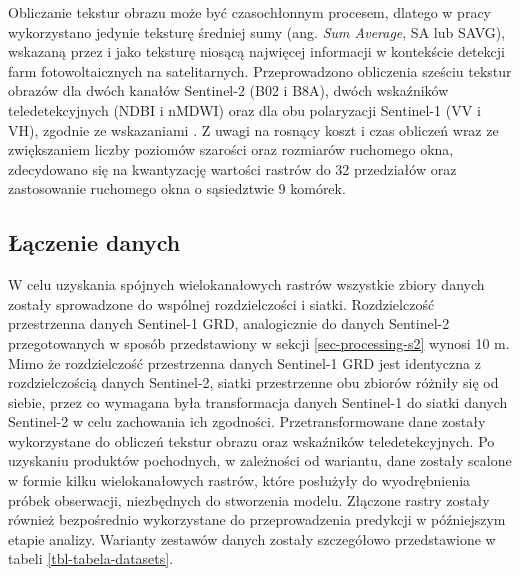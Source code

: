 \documentclass{amuthesis}
\begin{document}
Obliczanie tekstur obrazu może być czasochłonnym procesem, dlatego w
pracy wykorzystano jedynie teksturę średniej sumy (ang. \emph{Sum
Average}, SA lub SAVG), wskazaną przez \textcite{zhang_2021_texture} i
\textcite{wang_2022_pv} jako teksturę niosącą najwięcej informacji w
kontekście detekcji farm fotowoltaicznych na satelitarnych.
Przeprowadzono obliczenia sześciu tekstur obrazów dla dwóch kanałów
Sentinel-2 (B02 i B8A), dwóch wskaźników teledetekcyjnych (NDBI i nMDWI)
oraz dla obu polaryzacji Sentinel-1 (VV i VH), zgodnie ze wskazaniami
\textcite{wang_2022_pv}. Z uwagi na rosnący koszt i czas obliczeń wraz
ze zwiększaniem liczby poziomów szarości oraz rozmiarów ruchomego okna,
zdecydowano się na kwantyzację wartości rastrów do 32 przedziałów oraz
zastosowanie ruchomego okna o sąsiedztwie 9 komórek.

\hypertarget{sec-processing-data-merging}{%
\subsection{Łączenie danych}\label{sec-processing-data-merging}}

W celu uzyskania spójnych wielokanałowych rastrów wszystkie zbiory
danych zostały sprowadzone do wspólnej rozdzielczości i siatki.
Rozdzielczość przestrzenna danych Sentinel-1 GRD, analogicznie do danych
Sentinel-2 przegotowanych w sposób przedstawiony w sekcji
\ref{sec-processing-s2} wynosi 10 m. Mimo że rozdzielczość przestrzenna
danych Sentinel-1 GRD jest identyczna z rozdzielczością danych
Sentinel-2, siatki przestrzenne obu zbiorów różniły się od siebie, przez
co wymagana była transformacja danych Sentinel-1 do siatki danych
Sentinel-2 w celu zachowania ich zgodności. Przetransformowane dane
zostały wykorzystane do obliczeń tekstur obrazu oraz wskaźników
teledetekcyjnych. Po uzyskaniu produktów pochodnych, w zależności od
wariantu, dane zostały scalone w formie kilku wielokanałowych rastrów,
które posłużyły do wyodrębnienia próbek obserwacji, niezbędnych do
stworzenia modelu. Złączone rastry zostały również bezpośrednio
wykorzystane do przeprowadzenia predykcji w późniejszym etapie analizy.
Warianty zestawów danych zostały szczegółowo przedstawione w tabeli
\ref{tbl-tabela-datasets}.
\end{document}
